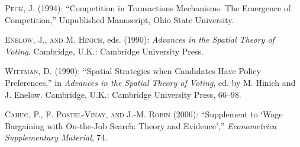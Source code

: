 \documentclass[ecta,nameyear,draft]{econsocart}
\theoremstyle{plain}
\theoremstyle{remark}
\begin{document}
\begin{thebibliography}{}
\textsc{Peck, J.} (1994):
``Competition in Transactions Mechanisms: The Emergence of Competition,''
Unpublished Manuscript, Ohio State University.
\endbibitem

\textsc{Enelow, J., and M. Hinich}, eds. (1990):
\textit{Advances in the Spatial Theory of Voting}.
Cambridge, U.K.: Cambridge University Press.
\endbibitem

\textsc{Wittman, D.} (1990):
``Spatial Strategies when Candidates Have Policy Preferences,''
in \textit{Advances in the Spatial Theory of Voting},
ed. by M. Hinich and J. Enelow.
Cambridge, U.K.: Cambridge University Press, 66--98.
\endbibitem

\textsc{Cahuc, P., F. Postel-Vinay, and J.-M. Robin} (2006): 
``Supplement to `Wage Bargaining with On-the-Job Search: Theory and Evidence',''
\textit{Econometrica Supplementary Material}, 74.
\endbibitem
\end{thebibliography}
\end{document}
